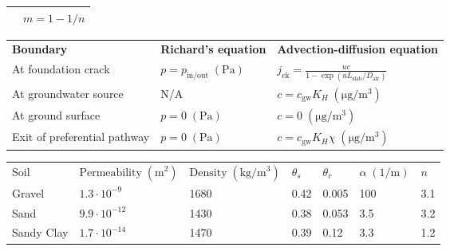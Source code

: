 \documentclass[journal=esthag,manuscript=article]{achemso}
\begin{document}
\begin{table}[htb!]
\begin{tabular}{l l}
                                  & $m = 1 - 1/n$ \\
    \bottomrule
  \end{tabular}
  \bigskip
  \begin{tabular}{l l l}
    \toprule
    \textbf{Boundary}          & \textbf{Richard's equation}      &   \textbf{Advection-diffusion equation} \\
    At foundation crack  & $p = p_\mathrm{in/out} \; \mathrm{(Pa)}$                            & $j_\mathrm{ck} = \frac{u c}{1 - \exp{(u L_\mathrm{slab}/D_\mathrm{air})}}$ \\
    At groundwater source &  N/A & $c = c_\mathrm{gw} K_H \; \mathrm{(\mu g/m^3)}$ \\
    At ground surface      & $p = 0 \; \mathrm{(Pa)}$  & $c = 0 \; \mathrm{(\mu g/m^3)}$ \\
    Exit of preferential pathway  & $p = 0 \; \mathrm{(Pa)}$  & $c = c_\mathrm{gw} K_H \chi \; \mathrm{(\mu g/m^3)}$ \\
    \bottomrule
  \end{tabular}
  \bigskip
  \begin{tabular}{l l l l l l l}
    \toprule
    Soil & $\text{Permeability} \; \mathrm{(m^2)}$  & $\mathrm{Density} \; \mathrm{(kg/m^3)}$  & $\theta_s$  & $\theta_r$  & $\alpha \; \mathrm{(1/m)}$  & $n$ \\
    Gravel     & $1.3 \cdot 10^{-9}$   & 1680    & 0.42        & 0.005       & 100       & 3.1 \\
    Sand     & $9.9 \cdot 10^{-12}$  & 1430    & 0.38        & 0.053        & 3.5       & 3.2 \\
    Sandy Clay    & $1.7 \cdot 10^{-14}$  & 1470    & 0.39        & 0.12        & 3.3       & 1.2 \\
    \bottomrule
  \end{tabular}
  \bigskip

\end{table}
\end{document}
